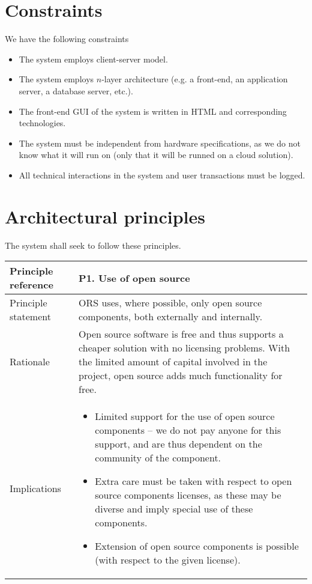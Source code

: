 \section{Constraints}
\label{sec:constraints}
We have the following constraints
\begin{itemize}
  \item The system employs client-server model.
  \item The system employs $n$-layer architecture (e.g. a front-end, an application server, a database server, etc.).
  \item The front-end GUI of the system is written in HTML and corresponding technologies.
  \item The system must be independent from hardware specifications, as we do not know what it will run on (only that it will be runned on a cloud solution).
  \item All technical interactions in the system and user transactions must be logged.
\end{itemize}


\section{Architectural principles}
\label{sec:arch-princ}
The system shall seek to follow these principles.
\begin{center}
  \begin{tabular}[h!]{| >{\columncolor{gray}}p{} | p{} |}
    \hline
    Principle reference & P1. Use of open source\\
    \hline
    Principle statement & ORS uses, where possible, only open source components, both externally and internally. \\
    \hline
    Rationale & Open source software is free and thus supports a cheaper solution with no licensing problems. With the limited amount of capital involved in the project, open source adds much functionality for free.\\
    \hline
    Implications &
      \begin{itemize}
        \item Limited support for the use of open source components -- we do not pay anyone for this support, and are thus dependent on the community of the component.
        \item Extra care must be taken with respect to open source components licenses, as these may be diverse and imply special use of these components.
        \item Extension of open source components is possible (with respect to the given license).
      \end{itemize}\\
    \hline
  \end{tabular}
\end{center}

